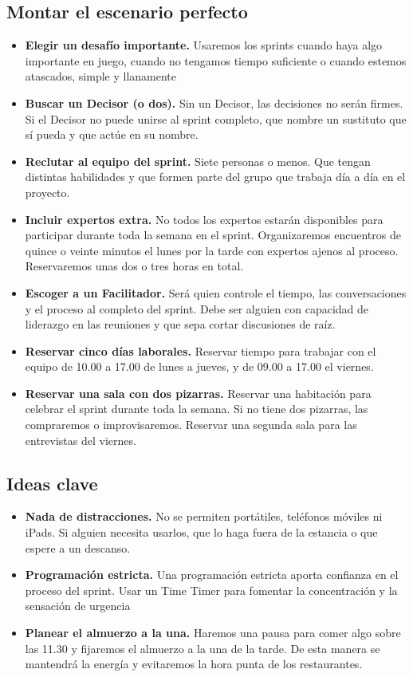 \documentclass[10pt]{article}
\begin{document}
\begin{multicols}{2}
\section*{Montar el escenario perfecto}
\begin{itemize}
\item \textbf{Elegir un desafío importante.} Usaremos los sprints cuando haya algo importante en juego, cuando no tengamos tiempo suficiente o cuando estemos atascados, simple y llanamente
\item \textbf{Buscar un Decisor (o dos).} Sin un Decisor, las decisiones no serán firmes. Si el Decisor no puede unirse al sprint completo, que nombre un sustituto que sí pueda y que actúe en su nombre.
\item \textbf{Reclutar al equipo del sprint.} Siete personas o menos. Que tengan distintas habilidades y que formen parte del grupo que trabaja día a día en el proyecto.
\item \textbf{Incluir expertos extra.} No todos los expertos estarán disponibles para participar durante toda la semana en el sprint. Organizaremos encuentros de quince o veinte minutos el lunes por la tarde con expertos ajenos al proceso. Reservaremos unas dos o tres horas en total.
\item \textbf{Escoger a un Facilitador.} Será quien controle el tiempo, las conversaciones y el proceso al completo del sprint. Debe ser alguien con capacidad de liderazgo en las reuniones y que sepa cortar discusiones de raíz.
\item \textbf{Reservar cinco días laborales.} Reservar tiempo para trabajar con el equipo de 10.00 a 17.00 de lunes a jueves, y de 09.00 a 17.00 el viernes.
\item \textbf{Reservar una sala con dos pizarras.} Reservar una habitación para celebrar el sprint durante toda la semana. Si no tiene dos pizarras, las compraremos o improvisaremos. Reservar una segunda sala para las entrevistas del viernes.
\end{itemize}
\subsection*{Ideas clave}
\begin{itemize}
\item  \textbf{Nada de distracciones.} No se permiten portátiles, teléfonos móviles ni iPads. Si alguien necesita usarlos, que lo haga fuera de la estancia o que espere a un descanso.
\item \textbf{Programación estricta.} Una programación estricta aporta confianza en el proceso del sprint. Usar un Time Timer para fomentar la concentración y la sensación de urgencia
\item \textbf{Planear el almuerzo a la una.} Haremos una pausa para comer algo sobre las 11.30 y fijaremos el almuerzo a la una de la tarde. De esta manera se mantendrá la energía y evitaremos la hora punta de los restaurantes.
\end{itemize}

\end{multicols}
\end{document}
